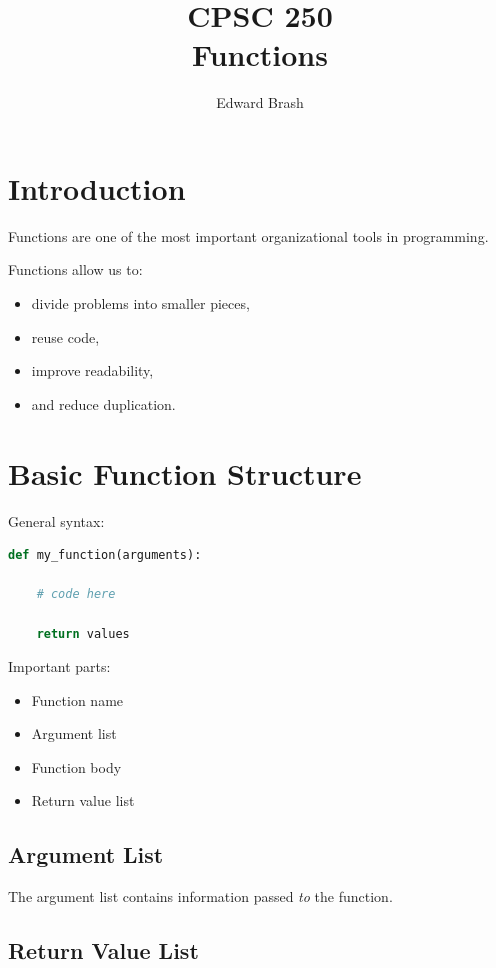 \documentclass[11pt]{article}
\title{CPSC 250 \\ Functions}
\author{Edward Brash}
\date{}
\begin{document}
\maketitle

\section{Introduction}

Functions are one of the most important organizational tools in programming.

Functions allow us to:

\begin{itemize}
    \item divide problems into smaller pieces,
    \item reuse code,
    \item improve readability,
    \item and reduce duplication.
\end{itemize}

\section{Basic Function Structure}

General syntax:

\begin{lstlisting}[language=Python]
def my_function(arguments):

    # code here

    return values
\end{lstlisting}

Important parts:

\begin{itemize}
    \item Function name
    \item Argument list
    \item Function body
    \item Return value list
\end{itemize}

\subsection{Argument List}

The argument list contains information passed \emph{to} the function.

\subsection{Return Value List}
\end{document}
